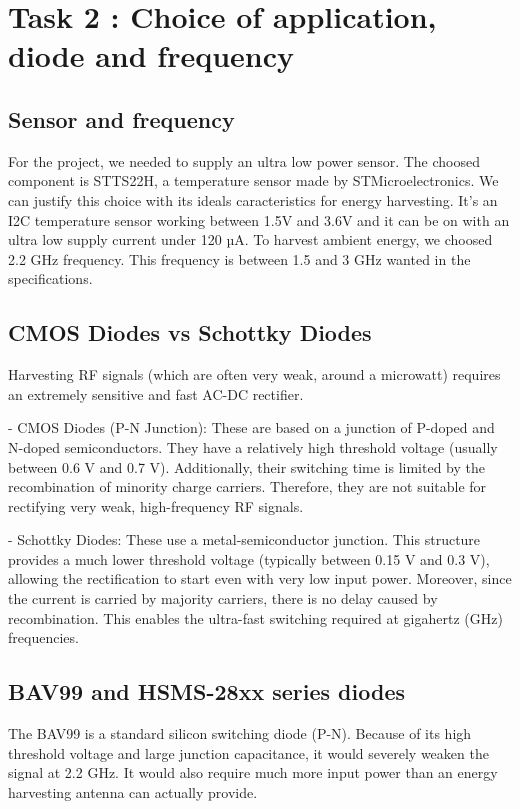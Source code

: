 \section{Task 2 : Choice of application, diode and frequency}
\label{sec:task2}

\subsection{Sensor and frequency}
For the project, we needed to supply an ultra low power sensor. The choosed component is STTS22H, 
a temperature sensor made by STMicroelectronics. We can justify this choice with its ideals caracteristics 
for energy harvesting. It’s an I2C temperature sensor working between 1.5V and 3.6V and it can be on with 
an ultra low supply current under 120 µA. To harvest ambient energy, we choosed 2.2 GHz frequency. 
This frequency is between 1.5 and 3 GHz wanted in the specifications.

\subsection{CMOS Diodes vs Schottky Diodes}
Harvesting RF signals (which are often very weak, around a microwatt) requires an extremely sensitive and fast AC-DC rectifier.

- CMOS Diodes (P-N Junction): These are based on a junction of P-doped and N-doped semiconductors. 
They have a relatively high threshold voltage (usually between 0.6 V and 0.7 V). 
Additionally, their switching time is limited by the recombination of minority charge carriers. 
Therefore, they are not suitable for rectifying very weak, high-frequency RF signals.

- Schottky Diodes: These use a metal-semiconductor junction. This structure provides a much lower threshold voltage 
(typically between 0.15 V and 0.3 V), allowing the rectification to start even with very low input power. 
Moreover, since the current is carried by majority carriers, there is no delay caused by recombination. 
This enables the ultra-fast switching required at gigahertz (GHz) frequencies.

\subsection{BAV99 and HSMS-28xx series diodes}
The BAV99 is a standard silicon switching diode (P-N). Because of its high threshold voltage 
and large junction capacitance, it would severely weaken the signal at 2.2 GHz. It would also 
require much more input power than an energy harvesting antenna can actually provide.

